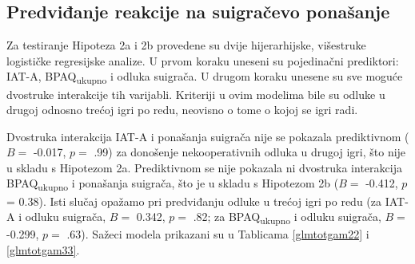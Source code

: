 \documentclass[a4paper, 12pt]{report}
\begin{document}
\subsection{Predviđanje reakcije na suigračevo ponašanje}

Za testiranje Hipoteza 2a i 2b provedene su dvije hijerarhijske, višestruke logističke
regresijske analize. U prvom koraku uneseni su pojedinačni prediktori: IAT-A,
BPAQ\textsubscript{ukupno} i odluka suigrača. U drugom koraku
unesene su sve moguće dvostruke interakcije tih varijabli. Kriteriji u ovim
modelima bile su odluke u drugoj odnosno trećoj igri po redu, neovisno o tome o kojoj se
igri radi.

Dvostruka interakcija IAT-A i ponašanja suigrača nije se pokazala prediktivnom
($B =$ -0.017, $p =$ .99)
za donošenje nekooperativnih odluka u drugoj igri, što nije u skladu s Hipotezom
2a. Prediktivnom se nije pokazala ni dvostruka interakcija BPAQ\textsubscript{ukupno}
i ponašanja suigrača, što je u skladu s Hipotezom 2b ($B =$ -0.412, $p $ = 0.38).
Isti slučaj opažamo pri predviđanju odluke u trećoj igri po redu (za IAT-A i
odluku suigrača, $B =$ 0.342, $p =$ .82; za BPAQ\textsubscript{ukupno} i odluku
suigrača, $B =$ -0.299, $p =$ .63). Sažeci modela prikazani su u Tablicama
\ref{glmtotgam22} i \ref{glmtotgam33}.
\end{document}

